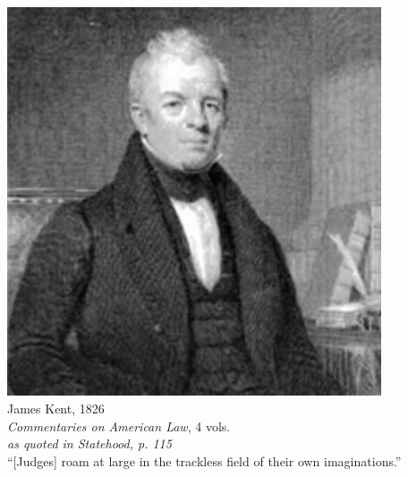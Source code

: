 % 
% 
\begin{frame}
    \begin{columns}[onlytextwidth]
            \centering
            \includegraphics[width=0.95\textwidth]{img/james-kent.png} \\
            James Kent, 1826 \\
            \emph{Commentaries on American Law}, 4 vols. \\
            \small{\emph{as quoted in Statehood, p. 115}} \\

            { \large ``[Judges] roam at large in the trackless field of their own imaginations.''}
    \end{columns}
\end{frame}

